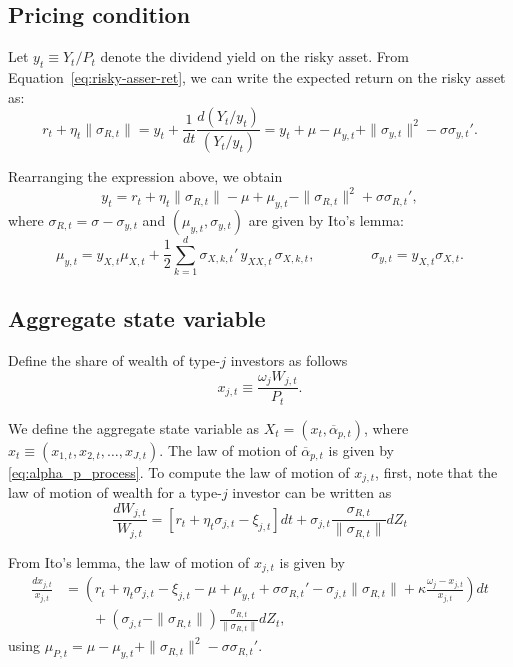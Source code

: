 \subsection{Pricing condition} 

Let $y_t \equiv Y_t/P_t$ denote the dividend yield on the risky asset. From Equation~\eqref{eq:risky-asser-ret}, we can write the expected return on the risky asset as:
\begin{equation}
    r_t + \eta_t \| \sigma_{R,t}\| = y_t + \frac{1}{dt} \frac{d(Y_t/y_t)}{(Y_t/y_t)} = y_t + \mu - \mu_{y,t} + \|\sigma_{y,t}\|^2 - \sigma \sigma_{y,t}'.
\end{equation}

Rearranging the expression above, we obtain
\begin{equation}\label{app:pricing_cond}
    y_t = r_t + \eta_t \|\sigma_{R,t}\| -\mu + \mu_{y,t} - \|\sigma_{R,t}\|^2+ \sigma \sigma_{R,t}',
\end{equation}
where $\sigma_{R,t} = \sigma - \sigma_{y,t}$ and $(\mu_{y,t}, \sigma_{y,t})$ are given by Ito's lemma:
\begin{equation}
    \mu_{y,t} = y_{X,t} \mu_{X,t} + \frac{1}{2}\sum_{k=1}^d \sigma_{X,k,t}'\,y_{XX,t}\,\sigma_{X,k,t}, \qquad \qquad 
    \sigma_{y,t} = y_{X,t} \sigma_{X,t}.
\end{equation}

\subsection{Aggregate state variable}

Define the share of wealth of type-$j$ investors as follows
\begin{equation}
    x_{j,t} \equiv \frac{\omega_j W_{j,t}}{P_t}.
\end{equation}

We define the aggregate state variable as $X_t = (x_t, \overline{\alpha}_{p,t})$, where $x_t \equiv (x_{1,t}, x_{2,t}, \ldots, x_{J,t})$. The law of motion of $\overline{\alpha}_{p,t}$ is given by \eqref{eq:alpha_p_process}. To compute the law of motion of $x_{j,t}$, first, note that the law of motion of wealth for a type-$j$ investor can be written as
\begin{equation}
    \frac{d W_{j,t}}{W_{j,t}} = \left[ r_t + \eta_t \sigma_{j,t} - \xi_{j,t} \right]dt + \sigma_{j,t} \frac{\sigma_{R,t}}{\|\sigma_{R,t}\|} d Z_t
\end{equation}

From Ito's lemma, the law of motion of $x_{j,t}$ is given by
\begin{align}
    \frac{d x_{j,t}}{x_{j,t}} &= \left( r_t + \eta_t \sigma_{j,t} - \xi_{j,t} -\mu + \mu_{y,t} + \sigma \sigma_{R,t}'  - \sigma_{j,t} \|\sigma_{R,t}\|  +\kappa \frac{\omega_j-x_{j,t}}{x_{j,t}}  \right) dt \nonumber\\
    &\qquad + (\sigma_{j,t} - \|\sigma_{R,t}\|)\frac{\sigma_{R,t}}{\|\sigma_{R,t}\|} d Z_t,
\end{align}
using $\mu_{P,t} =\mu - \mu_{y,t} + \|\sigma_{R,t}\|^2 - \sigma \sigma_{R,t}' $. 


